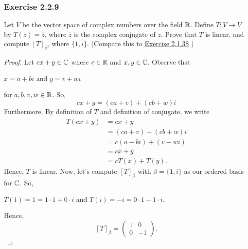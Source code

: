 \subsubsection{Exercise 2.2.9} Let \( V  \) be the vector space of complex numbers over the field \( \mathbb{R} \). Define \( T: V \to V  \) by \( T(z) = \overline{z} \), where \( \overline{z} \) is the complex conjugate of \( z  \). Prove that \( T  \) is linear, and compute \( [T]_{\beta}^{}  \), where \( \{ 1,i  \} \). (Compare this to {\hyperref[Exercise 2.1.38]{Exercise 2.1.38}} )
\begin{proof}
Let \( cx + y \in \mathbb{C}  \) where \( c \in \mathbb{R}  \) and \( x,y \in \mathbb{C}  \). Observe that 
\begin{center}
    \( x = a + bi  \) and \( y = v + wi \)
\end{center}
for \( a,b,v,w \in \mathbb{R}  \). So,  
\[ cx + y = (ca + v) + (cb + w)i   \]
Furthermore, 
By definition of \( T \) and definition of conjugate, we write
\begin{align*}
    T(cx +y) &= \overline{cx+y} \\
             &= (ca+v) - (cb + w)i \\
             &= c(a - bi) + (v - wi) \\
             &= c \overline{x} + \overline{y} \\ 
             &= c T(x) + T(y).
\end{align*}
Hence, \( T  \) is linear. 
Now, let's compute \( [T]_{\beta}^{}   \) with \( \beta = \{ 1,i \}  \) as our ordered basis for \( \mathbb{C}  \). So, 
\begin{center}
    \( T(1) = 1 = 1 \cdot 1 + 0 \cdot i \) and \( T(i) = -i = 0 \cdot 1 - 1 \cdot i  \).
\end{center}
Hence, 
\[  [T]_{\beta}^{} = \begin{pmatrix}
    1 & 0 \\
    0 & -1 
\end{pmatrix}. \]
\end{proof}

